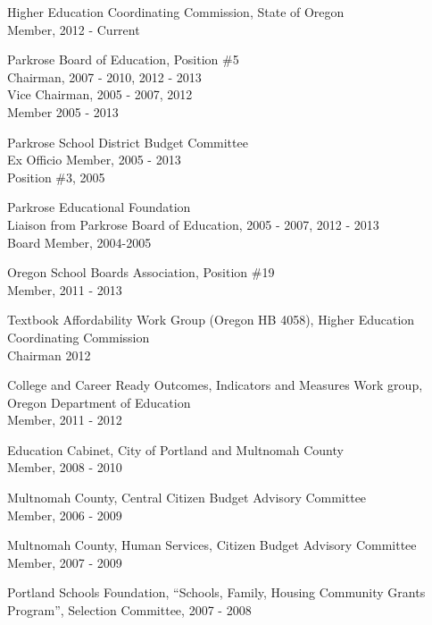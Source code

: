 \documentclass[Computer Science]{vita}
\begin{document}
\begin{vita}
\begin{Selected Professional and Service Activities}
\begin{Community}
    \item Higher Education Coordinating Commission, State of Oregon\\
  Member, 2012 - Current 

    \item Parkrose Board of Education, Position \#5\\
      Chairman, 2007 - 2010, 2012 - 2013\\
      Vice Chairman, 2005 - 2007, 2012 \\
      Member 2005 - 2013

    \item Parkrose School District Budget Committee\\
      Ex Officio Member, 2005 - 2013\\
      Position \#3, 2005

\item Parkrose Educational Foundation\\
      Liaison from Parkrose Board of Education, 2005 - 2007, 2012 - 2013\\
      Board Member, 2004-2005


    \item Oregon School Boards Association, Position \#19\\
    Member, 2011 - 2013

  \item Textbook Affordability Work Group (Oregon HB 4058), Higher Education Coordinating Commission\\ Chairman 2012

  \item College and Career Ready Outcomes, Indicators and Measures Work group, Oregon Department of Education\\
    Member, 2011 -  2012

    \item  Education Cabinet, City of Portland and Multnomah County\\
      Member, 2008 - 2010

    \item Multnomah County, Central Citizen Budget Advisory Committee\\
      Member, 2006 - 2009

    \item Multnomah County, Human Services, Citizen Budget Advisory
      Committee\\Member, 2007 - 2009

    \item Portland Schools Foundation, ``Schools, Family, Housing
      Community Grants Program'', Selection Committee, 2007 - 2008


\end{Community}
\end{Selected Professional and Service Activities}
\end{vita}
\end{document}
